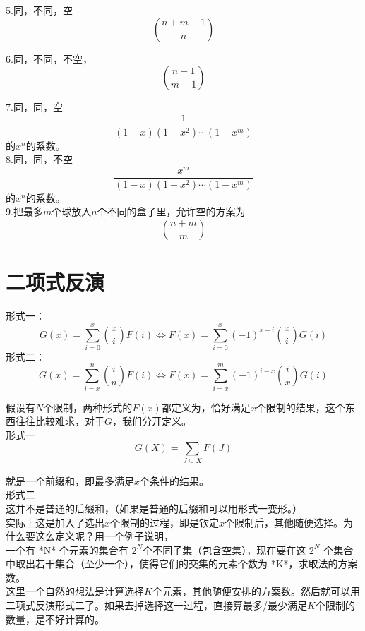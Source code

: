 5.同，不同，空
$$
\binom{n+m-1}{n}
$$

6.同，不同，不空，
$$
\binom{n-1}{m-1}
$$

7.同，同，空
$$
\frac{1}{(1-x)(1-x^2)\cdots (1-x^m)}
$$
的$x^n$的系数。\\

8.同，同，不空
$$
\frac{x^m}{(1-x)(1-x^2)\cdots (1-x^m)}
$$
的$x^n$的系数。\\

9.把最多$m$个球放入$n$个不同的盒子里，允许空的方案为
$$
\binom{n+m}{m}
$$



\section{二项式反演}

\begin{theorem}
形式一：\\
$$
G(x)=\sum_{i=0}^{x}\binom{x}{i} F(i) \iff F(x)=\sum_{i=0}^{x} (-1)^{x-i}\binom{x}{i} G(i)
$$
形式二：\\
$$
G(x)=\sum_{i=x}^{n} \binom{i}{n} F(i) \iff F(x)=\sum_{i=x}^{m}(-1)^{i-x}\binom{i}{x}G(i)
$$
\end{theorem}

假设有$N$个限制，两种形式的$F(x)$都定义为，恰好满足$x$个限制的结果，这个东西往往比较难求，对于$G$，我们分开定义。\\

形式一\\

$$
G(X)=\sum_{J \subseteq X} F(J)
$$

就是一个前缀和，即最多满足$x$个条件的结果。\\

形式二\\

这并不是普通的后缀和，（如果是普通的后缀和可以用形式一变形。）\\

实际上这是加入了选出$x$个限制的过程，即是钦定$x$个限制后，其他随便选择。为什么要这么定义呢？用一个例子说明，\\

一个有 *N* 个元素的集合有 $2^{N}$个不同子集（包含空集），现在要在这 $2^{N}$ 个集合中取出若干集合（至少一个），使得它们的交集的元素个数为 *K*，求取法的方案数。\\

这里一个自然的想法是计算选择$K$个元素，其他随便安排的方案数。然后就可以用二项式反演形式二了。如果去掉选择这一过程，直接算最多/最少满足$K$个限制的数量，是不好计算的。\\

